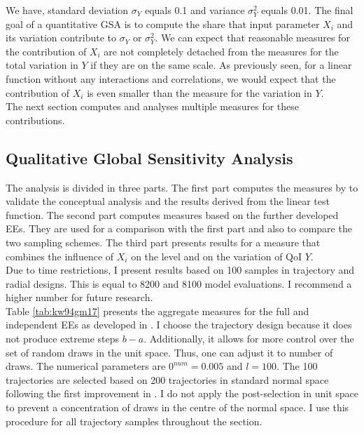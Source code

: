 \noindent
We have, standard deviation $\sigma_Y$ equals 0.1 and variance $\sigma_Y^2$ equals 0.01. The final goal of a quantitative GSA is to compute the share that input parameter $X_i$ and its variation contribute to $\sigma_Y$ or $\sigma_Y^2$. We can expect that reasonable measures for the contribution of $X_i$ are not completely detached from the measures for the total variation in $Y$ if they are on the same scale. As previously seen, for a linear function without any interactions and correlations, we would expect that the contribution of $X_i$ is even smaller than the measure for the variation in $Y$.\\


\noindent
The next section computes and analyses multiple measures for these contributions.


\subsection{Qualitative Global Sensitivity Analysis}

The analysis is divided in three parts. The first part computes the measures by \cite{ge2017extending} to validate the conceptual analysis and the results derived from the linear test function. The second part computes measures based on the further developed EEs. They are used for a comparison with the first part and also to compare the two sampling schemes. The third part presents results for a measure that combines the influence of $X_i$ on the level and on the variation of QoI $Y$.\\

\noindent
Due to time restrictions, I present results based on 100 samples in trajectory and radial designs. This is equal to 8200 and 8100 model evaluations. I recommend a higher number for future research.\\

\noindent
Table \ref{tab:kw94gm17} presents the aggregate measures for the full and independent EEs as developed in \cite{ge2014efficient}. I choose the trajectory design because it does not produce extreme steps $b-a$. Additionally, it allows for more control over the set of random draws in the unit space. Thus, one can adjust it to number of draws. The numerical parameters are $0^{num}=0.005$ and $l=100$. The 100 trajectories are selected based on 200 trajectories in standard normal space following the first improvement in \cite{ge2014efficient}. I do not apply the post-selection in unit space to prevent a concentration of draws in the centre of the normal space. I use this procedure for all trajectory samples throughout the section.\\

